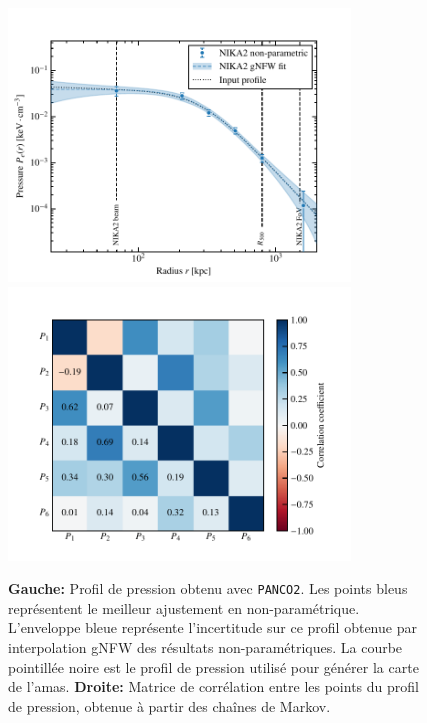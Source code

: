 \begin{figure}[t]
    \centering
    \includegraphics[height=7.25cm, trim={0cm 0cm 1cm 0cm}, clip]{Figures/Chap_panco/demo_plots/pressure.pdf}
    \includegraphics[height=7.25cm, trim={1cm 0cm 0cm 0cm}, clip]{Figures/Chap_panco/demo_plots/pressure_correlations.pdf}
    \caption{
        \textbf{Gauche:} Profil de pression obtenu avec \texttt{PANCO2}.
        Les points bleus représentent le meilleur ajustement en non-paramétrique.
        L'enveloppe bleue représente l'incertitude sur ce profil obtenue par interpolation gNFW des résultats non-paramétriques.
        La courbe pointillée noire est le profil de pression utilisé pour générer la carte de l'amas.
        \textbf{Droite:} Matrice de corrélation entre les points du profil de pression, obtenue à partir des chaînes de Markov.
    }
    \label{fig:panco2:actlike_press}
\end{figure}

